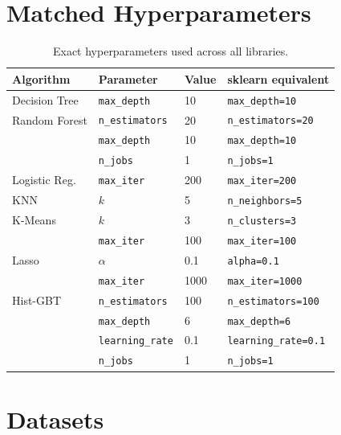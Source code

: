 \documentclass[11pt,a4paper]{article}
\begin{document}
\section{Matched Hyperparameters}

\begin{table}[H]
\centering
\caption{Exact hyperparameters used across all libraries.}
\label{tab:hyperparams}
\begin{tabular}{llll}
\toprule
\textbf{Algorithm} & \textbf{Parameter} & \textbf{Value} & \textbf{sklearn equivalent} \\
\midrule
Decision Tree & \texttt{max\_depth} & 10 & \texttt{max\_depth=10} \\
\midrule
Random Forest & \texttt{n\_estimators} & 20 & \texttt{n\_estimators=20} \\
              & \texttt{max\_depth} & 10 & \texttt{max\_depth=10} \\
              & \texttt{n\_jobs} & 1 & \texttt{n\_jobs=1} \\
\midrule
Logistic Reg. & \texttt{max\_iter} & 200 & \texttt{max\_iter=200} \\
\midrule
KNN & $k$ & 5 & \texttt{n\_neighbors=5} \\
\midrule
K-Means & $k$ & 3 & \texttt{n\_clusters=3} \\
        & \texttt{max\_iter} & 100 & \texttt{max\_iter=100} \\
\midrule
Lasso & $\alpha$ & 0.1 & \texttt{alpha=0.1} \\
      & \texttt{max\_iter} & 1000 & \texttt{max\_iter=1000} \\
\midrule
Hist-GBT & \texttt{n\_estimators} & 100 & \texttt{n\_estimators=100} \\
         & \texttt{max\_depth} & 6 & \texttt{max\_depth=6} \\
         & \texttt{learning\_rate} & 0.1 & \texttt{learning\_rate=0.1} \\
         & \texttt{n\_jobs} & 1 & \texttt{n\_jobs=1} \\
\bottomrule
\end{tabular}
\end{table}

\section{Datasets}
\end{document}
